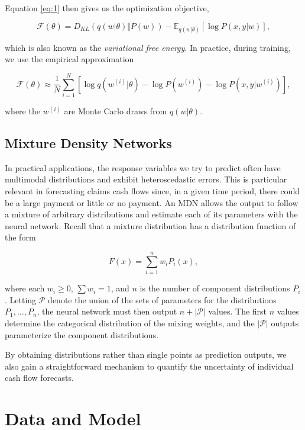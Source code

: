 \documentclass{article}
\begin{document}
Equation \ref{eq:1} then gives us the optimization objective,

\begin{equation}
    \mathcal{F}(\theta) = D_{KL}(q(w|\theta) \Vert P(w)) - \mathbb{E}_{q(w|\theta)}[\log P(x, y|w)],
\end{equation}

which is also known as the \textit{variational free energy}. In practice, during training, we use the empirical approximation

\begin{equation}
    \mathcal{F}(\theta) \approx \frac{1}{N} \sum_{i=1}^N [\log q(w^{(i)}|\theta) - \log P(w^{(i)}) - \log P(x, y|w^{(i)})],
\end{equation}

where the $w^{(i)}$ are Monte Carlo draws from $q(w|\theta)$.

\subsection{Mixture Density Networks}

In practical applications, the response variables we try to predict often have multimodal distributions and exhibit heteroscedastic errors. This is particular relevant in forecasting claims cash flows since, in a given time period, there could be a large payment or little or no payment. An MDN allows the output to follow a mixture of arbitrary distributions and estimate each of its parameters with the neural network. Recall that a mixture distribution has a distribution function of the form

\begin{equation}
    F(x) = \sum_{i = 1}^n w_i P_i(x),
\end{equation}

where each $w_i \geq 0$, $\sum w_i = 1$, and $n$ is the number of component distributions $P_i$. Letting $\mathcal{P}$ denote the union of the sets of parameters for the distributions $P_1, \dots, P_n$, the neural network must then output $n + |\mathcal{P}|$ values. The first $n$ values determine the categorical distribution of the mixing weights, and the $|\mathcal{P}|$ outputs parameterize the component distributions.

By obtaining distributions rather than single points as prediction outputs, we also gain a straightforward mechanism to quantify the uncertainty of individual cash flow forecasts.

\section{Data and Model}
\end{document}
